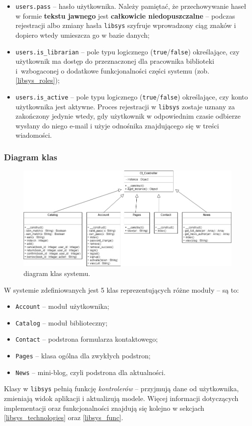 \documentclass[12pt, a4paper]{article}
\begin{document}
\begin{itemize}
    \item \texttt{users.pass} -- hasło użytkownika. Należy pamiętać, że przechowywanie haseł w formie \textbf{tekstu jawnego} jest \textbf{całkowicie niedopuszczalne} -- podczas rejestracji albo zmiany hasła \texttt{libsys} szyfruje wprowadzony ciąg znaków i dopiero wtedy umieszcza go w bazie danych;
    \item \texttt{users.is\_librarian} -- pole typu logicznego (\texttt{true}/\texttt{false}) określające, czy użytkownik ma dostęp do przeznaczonej dla pracownika biblioteki i~wzbogaconej o dodatkowe funkcjonalności części systemu (zob. \ref{libsys_roles});
    \item \texttt{users.is\_active} -- pole typu logicznego (\texttt{true}/\texttt{false}) określające, czy konto użytkownika jest aktywne. Proces rejestracji w \texttt{libsys} zostaje uznany za zakończony jedynie wtedy, gdy użytkownik w odpowiednim czasie odbierze wysłany do niego e-mail i użyje odnośnika znajdującego się w treści wiadomości.
\end{itemize}

\subsubsection{Diagram klas}
\begin{figure}[h]
    \centering
    \includegraphics[width=\textwidth]{img/diagram_classes.png}
    \caption{diagram klas systemu.}
    \label{fig:classdiagram}
\end{figure}

W systemie zdefiniowanych jest 5 klas reprezentujących różne moduły -- są to:
\begin{itemize}
    \item \texttt{Account} -- moduł użytkownika;
    \item \texttt{Catalog} -- moduł biblioteczny;
    \item \texttt{Contact} -- podstrona formularza kontaktowego;
    \item \texttt{Pages} -- klasa ogólna dla zwykłych podstron;
    \item \texttt{News} -- mini-blog, czyli podstrona dla aktualności.
\end{itemize}
Klasy w \texttt{libsys} pełnią funkcję \textit{kontrolerów} -- przyjmują dane od użytkownika, zmieniają widok aplikacji i aktualizują modele. Więcej informacji dotyczących implementacji oraz funkcjonalności znajdują się kolejno w sekcjach \ref{libsys_technologies} oraz \ref{libsys_func}.
\end{document}
